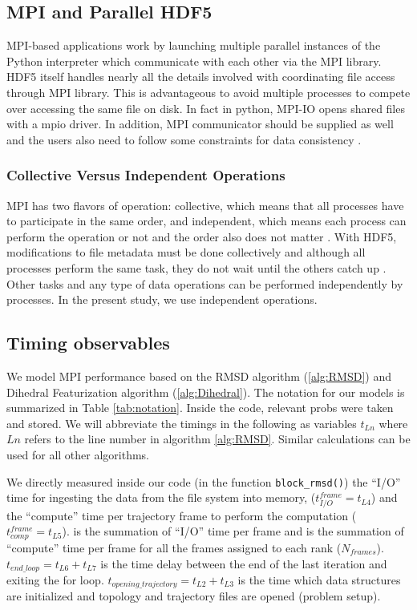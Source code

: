 \subsection{MPI and Parallel HDF5}
MPI-based applications work by launching multiple parallel instances of the Python interpreter which communicate with each other via the MPI library. 
HDF5 itself handles nearly all the details involved with coordinating file access through MPI library.
This is advantageous to avoid multiple processes to compete over accessing the same file on disk. 
In fact in python, MPI-IO opens shared files with a mpio driver. 
In addition,  MPI communicator should be supplied as well and the users also need to follow some constraints for data consistency \cite{pythonhdf5}.

\subsubsection{Collective Versus Independent Operations} 
MPI has two flavors of operation: collective, which means that all processes have to participate in the same order, and independent, which means each process can perform the operation or not and the order also does not matter  \cite{pythonhdf5}.
With HDF5, modifications to file metadata must be done collectively and although all processes perform the same task, they do not wait until the others catch up \cite{pythonhdf5}. 
Other tasks and any type of data operations can be performed independently by processes.
In the present study, we use independent operations.

\subsection{Timing observables}
We model MPI performance based on the RMSD algorithm (\ref{alg:RMSD}) and Dihedral Featurization algorithm (\ref{alg:Dihedral}). 
The notation for our models is summarized in Table \ref{tab:notation}.
Inside the code, relevant probs were taken and stored. 
We will abbreviate the timings in the following as variables $t_{Ln}$ where $Ln$ refers to the line number in algorithm \ref{alg:RMSD}.
Similar calculations can be used for all other algorithms.

We directly measured inside our code (in the function \texttt{block\_rmsd()}) the ``I/O'' time for
ingesting the data from the file system into memory, ($t_{I/O}^{frame} = t_{L4}$) and the ``compute'' time per
trajectory frame to perform the computation ($t_{comp}^{frame} = t_{L5}$). 
 \tIO is the summation of ``I/O'' time per frame and \tcomp is the summation of ``compute'' time per frame for all the frames assigned to each rank ($N_{frames}$). 
$t_{end\_loop} = t_{L6}+t_{L7}$ is the time delay between the end of the last iteration and exiting the for loop.
$t_{opening\_trajectory} = t_{L2}+t_{L3}$ is the time which data structures are initialized and topology and trajectory files are opened (problem setup).

